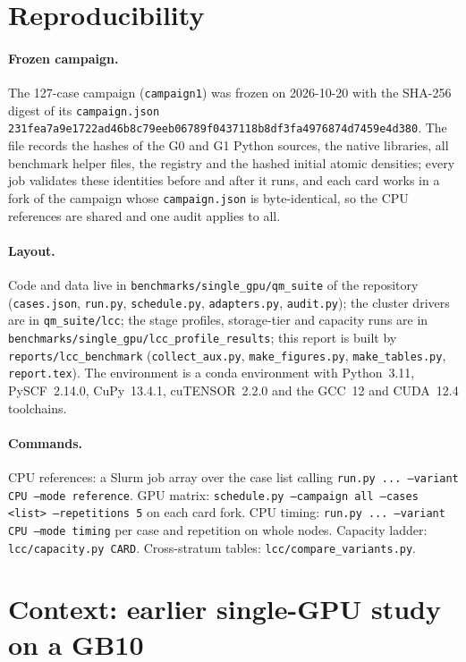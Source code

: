 \appendix
\section{Reproducibility}
\label{sec:repro}

\paragraph{Frozen campaign.} The 127-case campaign (\texttt{campaign1}) was frozen on 2026-10-20 with the SHA-256 digest of its \texttt{campaign.json} \texttt{\small 231fea7a9e1722ad46b8c79eeb06789f0437118b8df3fa4976874d7459e4d380}. The file records the hashes of the G0 and G1 Python sources, the native libraries, all benchmark helper files, the registry and the hashed initial atomic densities; every job validates these identities before and after it runs, and each card works in a fork of the campaign whose \texttt{campaign.json} is byte-identical, so the CPU references are shared and one audit applies to all.

\paragraph{Layout.}
Code and data live in \texttt{benchmarks/single\_gpu/qm\_suite} of the repository (\texttt{cases.json}, \texttt{run.py}, \texttt{schedule.py}, \texttt{adapters.py}, \texttt{audit.py}); the cluster drivers are in \texttt{qm\_suite/lcc}; the stage profiles, storage-tier and capacity runs are in \texttt{benchmarks/single\_gpu/lcc\_profile\_results}; this report is built by \texttt{reports/lcc\_benchmark} (\texttt{collect\_aux.py}, \texttt{make\_figures.py}, \texttt{make\_tables.py}, \texttt{report.tex}). The environment is a conda environment with Python~3.11, PySCF~2.14.0, CuPy~13.4.1, cuTENSOR~2.2.0 and the GCC~12 and CUDA~12.4 toolchains.

\paragraph{Commands.} CPU references: a Slurm job array over the case list calling \texttt{run.py ... --variant CPU --mode reference}. GPU matrix: \texttt{schedule.py --campaign all --cases <list> --repetitions 5} on each card fork. CPU timing: \texttt{run.py ... --variant CPU --mode timing} per case and repetition on whole nodes. Capacity ladder: \texttt{lcc/capacity.py CARD}. Cross-stratum tables: \texttt{lcc/compare\_variants.py}.

\section{Context: earlier single-GPU study on a GB10}
\label{sec:gb10}

